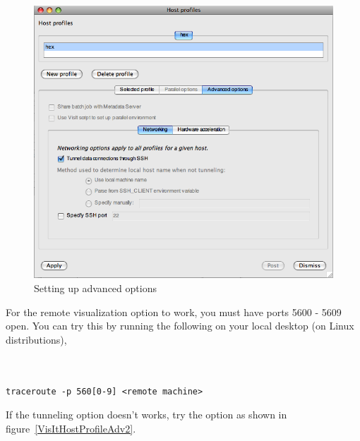 \documentclass[12pt]{article}
\begin{document}
\begin{figure}

  \center 
  \includegraphics[scale=0.20]{VisItHostProfileAdv.png}
  \caption{Setting up advanced options}
  \label{VisItHostProfileAdv}

\end{figure}

For the remote visualization option to work, you must have ports 5600
- 5609 open. You can try this by running the following on your local
desktop (on Linux distributions),

\begin{verbatim}


traceroute -p 560[0-9] <remote machine> 
\end{verbatim}

If the tunneling option doesn't works, try the option as shown in
figure~\ref{VisItHostProfileAdv2}.
\end{document}
